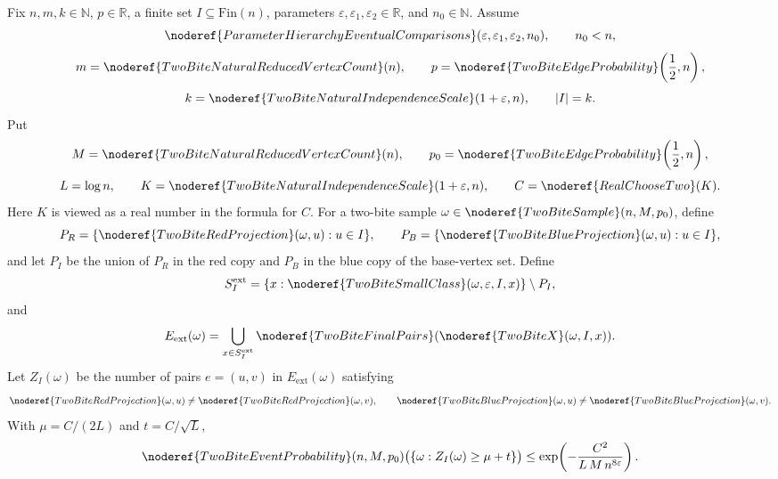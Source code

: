 \begin{lemma}
Fix \(n,m,k\in\mathbb N\), \(p\in\mathbb R\), a finite set
\(I\subseteq\mathrm{Fin}(n)\), parameters
\(\varepsilon,\varepsilon_1,\varepsilon_2\in\mathbb R\), and \(n_0\in\mathbb N\).
Assume
\[
\noderef{ParameterHierarchyEventualComparisons}
  (\varepsilon,\varepsilon_1,\varepsilon_2,n_0),
\qquad n_0<n,
\]
\[
m=\noderef{TwoBiteNaturalReducedVertexCount}(n),\qquad
p=\noderef{TwoBiteEdgeProbability}\!\left(\frac12,n\right),
\]
\[
k=\noderef{TwoBiteNaturalIndependenceScale}(1+\varepsilon,n),
\qquad |I|=k.
\]
Put
\[
M=\noderef{TwoBiteNaturalReducedVertexCount}(n),\qquad
p_0=\noderef{TwoBiteEdgeProbability}\!\left(\frac12,n\right),
\]
\[
L=\log n,\qquad
K=\noderef{TwoBiteNaturalIndependenceScale}(1+\varepsilon,n),
\qquad
C=\noderef{RealChooseTwo}(K).
\]
Here \(K\) is viewed as a real number in the formula for \(C\).  For a
two-bite sample \(\omega\in\noderef{TwoBiteSample}(n,M,p_0)\), define
\[
P_R=\{\noderef{TwoBiteRedProjection}(\omega,u):u\in I\},\qquad
P_B=\{\noderef{TwoBiteBlueProjection}(\omega,u):u\in I\},
\]
and let \(P_I\) be the union of \(P_R\) in the red copy and \(P_B\) in the
blue copy of the base-vertex set.  Define
\[
S_I^{\mathrm{ext}}
=\{x:\noderef{TwoBiteSmallClass}(\omega,\varepsilon,I,x)\}\setminus P_I,
\]
and
\[
E_{\mathrm{ext}}(\omega)
=\bigcup_{x\in S_I^{\mathrm{ext}}}
  \noderef{TwoBiteFinalPairs}(\noderef{TwoBiteX}(\omega,I,x)).
\]
Let \(Z_I(\omega)\) be the number of pairs \(e=(u,v)\) in
\(E_{\mathrm{ext}}(\omega)\) satisfying
\[
\noderef{TwoBiteRedProjection}(\omega,u)
  \ne\noderef{TwoBiteRedProjection}(\omega,v),\qquad
\noderef{TwoBiteBlueProjection}(\omega,u)
  \ne\noderef{TwoBiteBlueProjection}(\omega,v).
\]
With \(\mu=C/(2L)\) and \(t=C/\sqrt L\),
\[
\noderef{TwoBiteEventProbability}(n,M,p_0)
 \bigl(\{\omega:Z_I(\omega)\ge \mu+t\}\bigr)
\le
\exp\!\left(
-\frac{C^2}{L\,M\,n^{8\varepsilon}}
\right).
\]
\end{lemma}
